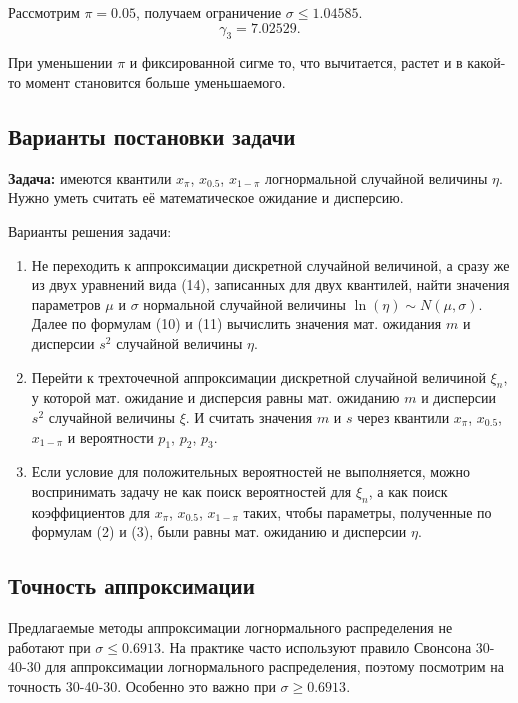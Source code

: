 \documentclass[12pt]{article}
\begin{document}
	Рассмотрим $\pi = 0.05$, получаем ограничение $\sigma \leq 1.04585$.
	\[\gamma_{3} = 7.02529.\]
	
	 При уменьшении $\pi$ и фиксированной сигме то, что вычитается, растет и в какой-то момент становится больше уменьшаемого.
	
	
	\subsection{Варианты постановки задачи}
	
	\textbf{Задача:} имеются квантили $x_{\pi}$, $x_{0.5}$, $x_{1-\pi}$ логнормальной случайной величины $\eta$. Нужно уметь считать её математическое ожидание и дисперсию.
	
	Варианты решения задачи:
	\begin{enumerate}
		\item Не переходить к аппроксимации дискретной случайной величиной, а сразу же из двух уравнений вида (14), записанных для двух квантилей, найти значения параметров $\mu$ и $\sigma$ нормальной случайной величины $\ln(\eta)\sim N(\mu, \sigma)$. Далее по формулам (10) и (11) вычислить значения мат. ожидания $m$ и дисперсии $s^{2}$ случайной величины $\eta$.
		\item Перейти к трехточечной аппроксимации дискретной случайной величиной $\xi_{n}$, у которой мат. ожидание и дисперсия равны мат. ожиданию $m$ и дисперсии $s^{2}$ случайной величины $\xi$. И считать значения $m$ и $s$ через квантили $x_{\pi}$, $x_{0.5}$, $x_{1-\pi}$ и вероятности $p_{1}$, $p_{2}$, $p_{3}$.
		\item Если условие для положительных вероятностей не выполняется, можно воспринимать задачу не как поиск вероятностей для $\xi_{n}$, а как поиск коэффициентов для $x_{\pi}$, $x_{0.5}$, $x_{1-\pi}$ таких, чтобы параметры, полученные по формулам (2) и (3), были равны мат. ожиданию и дисперсии $\eta$. 
	\end{enumerate}
	
	\subsection{Точность аппроксимации}

 Предлагаемые методы аппроксимации логнормального распределения не работают при $\sigma \leq 0.6913$. На практике часто используют правило Свонсона 30-40-30 для аппроксимации логнормального распределения, поэтому посмотрим на точность 30-40-30. Особенно это важно при $\sigma \geq 0.6913$.
	
\end{document}
